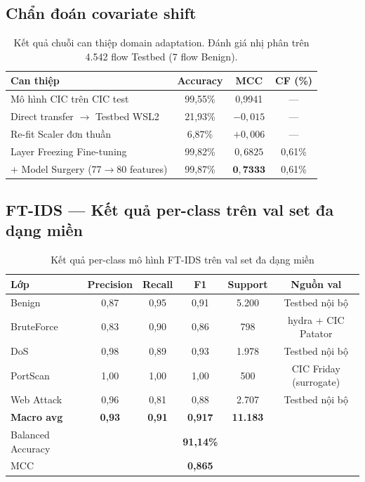 \documentclass[../DoAn.tex]{subfiles}
\begin{document}
\subsection{Chẩn đoán covariate shift}

\begin{table}[H]
    \centering
    \caption{Kết quả chuỗi can thiệp domain adaptation. Đánh giá nhị phân trên 4.542 flow Testbed (7 flow Benign).}
    \label{tab:res-domain}
    \begin{tabular}{lccc}
        \hline
        \textbf{Can thiệp} & \textbf{Accuracy} & \textbf{MCC} & \textbf{CF (\%)} \\
        \hline
        Mô hình CIC trên CIC test & 99,55\% & 0,9941 & --- \\
        Direct transfer $\to$ Testbed WSL2 & 21,93\% & $-0{,}015$ & --- \\
        Re-fit Scaler đơn thuần & 6,87\% & $+0{,}006$ & --- \\
        Layer Freezing Fine-tuning & 99,82\% & $0{,}6825$ & 0,61\% \\
        + Model Surgery (77$\to$80 features) & 99,87\% & $\mathbf{0{,}7333}$ & 0,61\% \\
        \hline
    \end{tabular}
\end{table}

\subsection{FT-IDS --- Kết quả per-class trên val set đa dạng miền}

\begin{table}[H]
    \centering
    \caption{Kết quả per-class mô hình FT-IDS trên val set đa dạng miền}
    \label{tab:res-v85}
    \begin{tabular}{lccccc}
        \hline
        \textbf{Lớp} & \textbf{Precision} & \textbf{Recall} & \textbf{F1} & \textbf{Support} & \textbf{Nguồn val} \\
        \hline
        Benign     & 0,87 & 0,95 & 0,91 & 5.200 & Testbed nội bộ \\
        BruteForce & 0,83 & 0,90 & 0,86 & 798 & hydra + CIC Patator \\
        DoS        & 0,98 & 0,89 & 0,93 & 1.978 & Testbed nội bộ \\
        PortScan   & 1,00 & 1,00 & 1,00 & 500 & CIC Friday (surrogate) \\
        Web Attack & 0,96 & 0,81 & 0,88 & 2.707 & Testbed nội bộ \\
        \hline
        \textbf{Macro avg} & \textbf{0,93} & \textbf{0,91} & \textbf{0,917} & \textbf{11.183} & \\
        Balanced Accuracy  & & & \textbf{91,14\%} & & \\
        MCC                & & & \textbf{0,865}  & & \\
        \hline
    \end{tabular}
\end{table}
\end{document}
